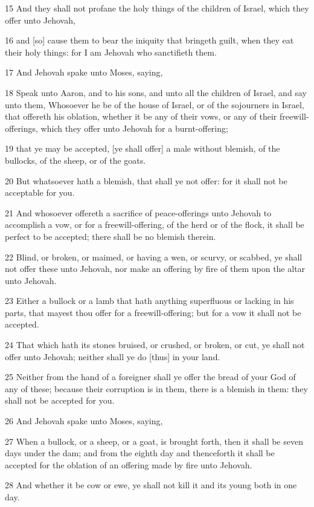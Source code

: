\par 15 And they shall not profane the holy things of the children of Israel, which they offer unto Jehovah,
\par 16 and [so] cause them to bear the iniquity that bringeth guilt, when they eat their holy things: for I am Jehovah who sanctifieth them.
\par 17 And Jehovah spake unto Moses, saying,
\par 18 Speak unto Aaron, and to his sons, and unto all the children of Israel, and say unto them, Whosoever he be of the house of Israel, or of the sojourners in Israel, that offereth his oblation, whether it be any of their vows, or any of their freewill-offerings, which they offer unto Jehovah for a burnt-offering;
\par 19 that ye may be accepted, [ye shall offer] a male without blemish, of the bullocks, of the sheep, or of the goats.
\par 20 But whatsoever hath a blemish, that shall ye not offer: for it shall not be acceptable for you.
\par 21 And whosoever offereth a sacrifice of peace-offerings unto Jehovah to accomplish a vow, or for a freewill-offering, of the herd or of the flock, it shall be perfect to be accepted; there shall be no blemish therein.
\par 22 Blind, or broken, or maimed, or having a wen, or scurvy, or scabbed, ye shall not offer these unto Jehovah, nor make an offering by fire of them upon the altar unto Jehovah.
\par 23 Either a bullock or a lamb that hath anything superfluous or lacking in his parts, that mayest thou offer for a freewill-offering; but for a vow it shall not be accepted.
\par 24 That which hath its stones bruised, or crushed, or broken, or cut, ye shall not offer unto Jehovah; neither shall ye do [thus] in your land.
\par 25 Neither from the hand of a foreigner shall ye offer the bread of your God of any of these; because their corruption is in them, there is a blemish in them: they shall not be accepted for you.
\par 26 And Jehovah spake unto Moses, saying,
\par 27 When a bullock, or a sheep, or a goat, is brought forth, then it shall be seven days under the dam; and from the eighth day and thenceforth it shall be accepted for the oblation of an offering made by fire unto Jehovah.
\par 28 And whether it be cow or ewe, ye shall not kill it and its young both in one day.
